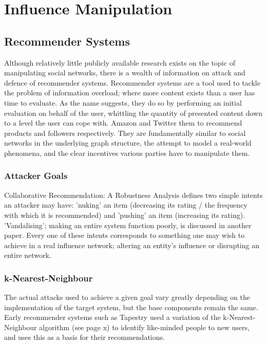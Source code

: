 \chapter{Influence Manipulation}

\section{Recommender Systems}

Although relatively little publicly available research exists on the topic of manipulating social networks, there is a wealth of information on attack and defence of recommender systems. Recommender systems are a tool used to tackle the problem of information overload; where more content exists than a user has time to evaluate. As the name suggests, they do so by performing an initial evaluation on behalf of the user, whittling the quantity of presented content down to a level the user can cope with. Amazon and Twitter them to recommend products and followers respectively. They are fundamentally similar to social networks in the underlying graph structure, the attempt to model a real-world phenomena, and the clear incentives various parties have to manipulate them.

\subsection{Attacker Goals}

Collaborative Recommendation: A Robustness Analysis defines two simple intents an attacker may have: 'nuking' an item (decreasing its rating / the frequency with which it is recommended) and 'pushing' an item (increasing its rating). 'Vandalising’; making an entire system function poorly, is discussed in another paper. Every one of these intents corresponds to something one may wish to achieve in a real influence network; altering an entity's influence or disrupting an entire network.

\subsection{k-Nearest-Neighbour}

The actual attacks used to achieve a given goal vary greatly depending on the implementation of the target system, but the base components remain the same. Early recommender systems such as Tapestry used a variation of the k-Nearest-Neighbour algorithm (see page x) to identify like-minded people to new users, and uses this as a basis for their recommendations.  

